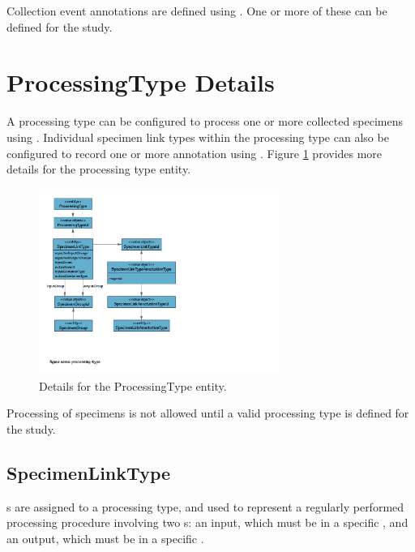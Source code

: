 Collection event annotations are defined using
. One or more of these can be
defined for the study.

\section{ProcessingType Details}
\label{sec:processing-type}

A processing type can be configured to process one or more collected specimens
using . Individual specimen link types within the
processing type can also be configured to record one or more annotation using
. Figure \ref{fig:processing-type}
provides more details for the processing type entity.

\begin{figure}[H]
  \centering
  \includegraphics[trim={9mm 48mm 120mm 9mm}, clip,
    width=0.7\textwidth]{images/processing-type}
  \caption{Details for the ProcessingType entity.}
  \label{fig:processing-type}
\end{figure}

Processing of specimens is not allowed until a valid processing type is defined
for the study.

\subsection*{SpecimenLinkType}

 s are assigned to
a processing type, and used to represent a regularly performed processing
procedure involving two s: an input, which must be in a
specific , and an output, which must be in a specific
.


